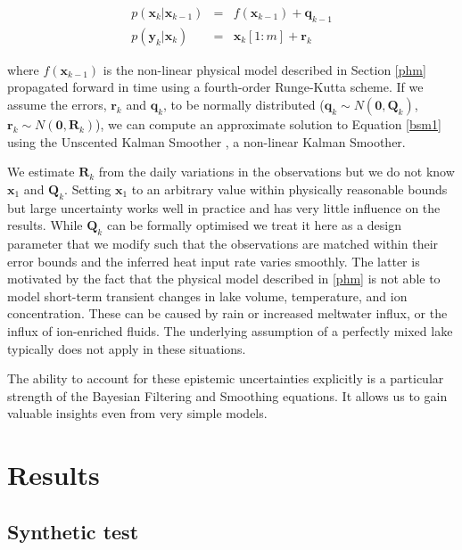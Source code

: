 \documentclass[doublespacing, linenumbers]{bmcart}
\newcommand{\bm}[1]{{\textbf{#1}}}
\begin{document}
\begin{eqnarray}
p(\bm{x}_k|\bm{x}_{k-1}) & = & f(\bm{x}_{k-1}) + \bm{q}_{k-1} \\
    p(\bm{y}_k|\bm{x}_k) & = & \bm{x}_k[1:m] + \bm{r}_k   
\end{eqnarray}

where $f(\bm{x}_{k-1})$ is the non-linear physical model described in Section
\ref{phm} propagated forward in time using a fourth-order Runge-Kutta scheme. If
we assume the errors, $\bm{r}_k$ and $\bm{q}_{k}$, to be normally distributed
($\bm{q}_{k} \sim N(\bm{0}, \bm{Q}_{k})$, $\bm{r}_k \sim N(\bm{0}, \bm{R}_k)$),
we can compute an approximate solution to Equation \ref{bsm1} using the
Unscented Kalman Smoother \citep{Merwe2004,
sarkkaBayesianFilteringSmoothing2013}, a non-linear Kalman Smoother.

We estimate $\bm{R}_k$ from the daily variations in the observations but we do
not know $\bm{x}_1$ and $\bm{Q}_{k}$. Setting $\bm{x}_1$ to an arbitrary value
within physically reasonable bounds but large uncertainty works well in practice
and has very little influence on the results. While $\bm{Q}_{k}$ can be formally
optimised we treat it here as a design parameter that we modify such that the
observations are matched within their error bounds and the inferred heat input
rate varies smoothly. The latter is motivated by the fact that the physical
model described in \ref{phm} is not able to model short-term transient changes
in lake volume, temperature, and ion concentration. These can be caused by rain
or increased meltwater influx, or the influx of ion-enriched fluids. The
underlying assumption of a perfectly mixed lake typically does not apply in
these situations. 

The ability to account for these epistemic uncertainties explicitly is a
particular strength of the Bayesian Filtering and Smoothing equations. It allows
us to gain valuable insights even from very simple models. 

\section{Results}
\subsection{Synthetic test}\label{syn_test} 
\end{document}
